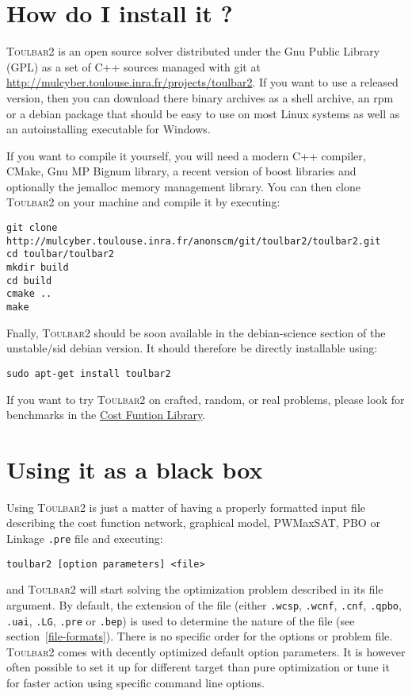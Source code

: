 \documentclass{article}
\def\toulbar2{\textsc{Toulbar2}}
\begin{document}
\section{How do I install it ?}


\toulbar2 is an open source solver distributed under the Gnu Public
Library (GPL) as a set of C++ sources managed with git at
\url{http://mulcyber.toulouse.inra.fr/projects/toulbar2}. If you want
to use a released version, then you can download there binary archives
as a shell archive, an rpm or a debian package that should be easy to
use on most Linux systems as well as an autoinstalling executable for
Windows.

If you want to compile it yourself, you will need a modern C++
compiler, CMake, Gnu MP Bignum library, a recent version of boost
libraries and optionally the jemalloc memory management library. You
can then clone \toulbar2 on your machine and compile it by executing:

\begin{verbatim}
git clone http://mulcyber.toulouse.inra.fr/anonscm/git/toulbar2/toulbar2.git
cd toulbar/toulbar2
mkdir build
cd build
cmake ..
make
\end{verbatim}

Fnally, \toulbar2 should be soon available in the debian-science
section of the unstable/sid debian version. It should therefore be
directly installable using:

\begin{verbatim}
sudo apt-get install toulbar2
\end{verbatim}

If you want to try \toulbar2 on crafted, random, or real problems,
please look for benchmarks in the
\href{https://mulcyber.toulouse.inra.fr/projects/costfunctionlib}{Cost
  Funtion Library}.

\section{Using it as a black box}

Using \toulbar2 is just a matter of having a properly formatted input
file describing the cost function network, graphical model, PWMaxSAT,
PBO or Linkage \texttt{.pre} file and executing:

\begin{verbatim}
toulbar2 [option parameters] <file>
\end{verbatim}

and \toulbar2 will start solving the optimization problem described in
its file argument. By default, the extension of the file (either
\texttt{.wcsp}, \texttt{.wcnf}, \texttt{.cnf}, \texttt{.qpbo},
\texttt{.uai}, \texttt{.LG}, \texttt{.pre} or \texttt{.bep}) is used
to determine the nature of the file (see
section~\ref{file-formats}). There is no specific order for the
options or problem file. \toulbar2 comes with decently optimized
default option parameters. It is however often possible to set it up
for different target than pure optimization or tune it for faster
action using specific command line options.
\end{document}
